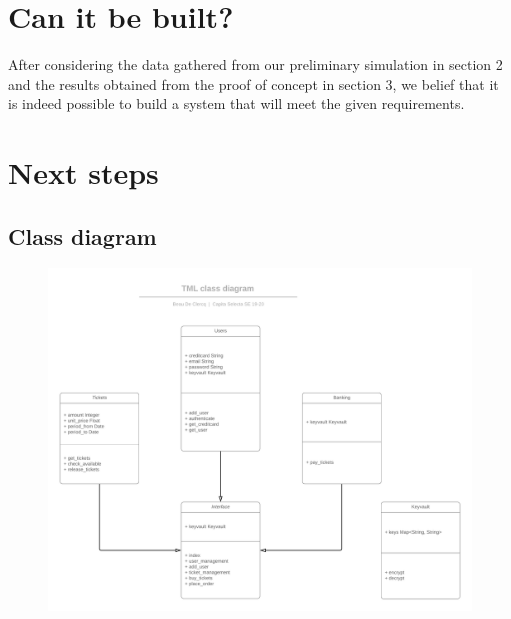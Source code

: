 \documentclass[10pt,a4paper,twocolumn]{article}
\begin{document}
\newpage
\section{Can it be built?}
After considering the data gathered from our preliminary simulation in section 2 and the results obtained from the proof of concept in section 3, we belief that it is indeed possible to build a system that will meet the given requirements.

\section{Next steps}

\newpage
\clearpage
\newpage
\begin{appendices}
	\section{Class diagram}
	\begin{figure}[h]
		\includegraphics*[scale=0.7]{class-diagram.png}
	\end{figure}

	\clearpage
	\newpage
	

\end{appendices}
\end{document}
